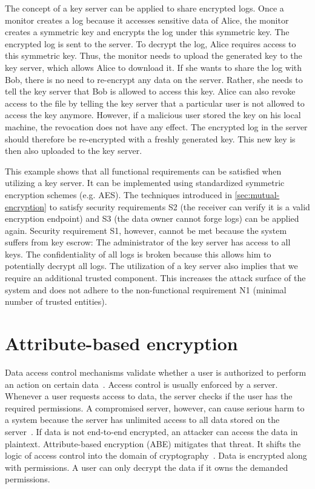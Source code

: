 \documentclass[../main.tex]{subfiles}
\begin{document}
The concept of a key server can be applied to share encrypted logs.
Once a monitor creates a log because it accesses sensitive data of Alice, the monitor creates a symmetric key and encrypts the log under this symmetric key.
The encrypted log is sent to the server.
To decrypt the log, Alice requires access to this symmetric key.
Thus, the monitor needs to upload the generated key to the key server, which allows Alice to download it.
If she wants to share the log with Bob, there is no need to re-encrypt any data on the server.
Rather, she needs to tell the key server that Bob is allowed to access this key.
Alice can also revoke access to the file by telling the key server that a particular user is not allowed to access the key anymore.
However, if a malicious user stored the key on his local machine, the revocation does not have any effect.
The encrypted log in the server should therefore be re-encrypted with a freshly generated key.
This new key is then also uploaded to the key server.

This example shows that all functional requirements can be satisfied when utilizing a key server.
It can be implemented using standardized symmetric encryption schemes (e.g. AES).
The techniques introduced in \cref{sec:mutual-encryption} to satisfy security requirements S2 (the receiver can verify it is a valid encryption endpoint) and S3 (the data owner cannot forge logs) can be applied again.
Security requirement S1, however, cannot be met because the system suffers from key escrow: 
The administrator of the key server has access to all keys.
The confidentiality of all logs is broken because this allows him to potentially decrypt all logs.
The utilization of a key server also implies that we require an additional trusted component.
This increases the attack surface of the system and does not adhere to the non-functional requirement N1 (minimal number of trusted entities).

\section{Attribute-based encryption}
\label{sec:attribute-encryption}
Data access control mechanisms validate whether a user is authorized to perform an action on certain data~\cite[242]{Eckert2018}.
Access control is usually enforced by a server.
Whenever a user requests access to data, the server checks if the user has the required permissions.
A compromised server, however, can cause serious harm to a system because the server has unlimited access to all data stored on the server~\cite{Hagg2022}.
If data is not end-to-end encrypted, an attacker can access the data in plaintext.
Attribute-based encryption (ABE) mitigates that threat.
It shifts the logic of access control into the domain of cryptography~\cite{Bethencourt2007}.
Data is encrypted along with permissions.
A user can only decrypt the data if it owns the demanded permissions.
\end{document}
